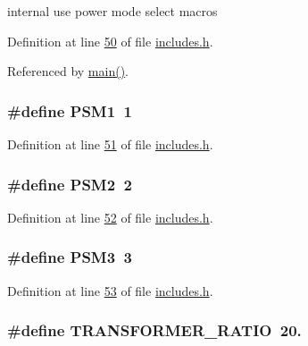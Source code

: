 internal use power mode select macros 



Definition at line \hyperlink{a00037_source_l00050}{50} of file \hyperlink{a00037_source}{includes.\-h}.



Referenced by \hyperlink{a00035_source_l00198}{main()}.

\hypertarget{a00037_aecb578b36faffafc55d7e5bfbe26df6a}{
\subsubsection[{P\-S\-M1}]{\setlength{\rightskip}{0pt plus 5cm}\#define P\-S\-M1~1}}\label{d1/dc6/a00037_aecb578b36faffafc55d7e5bfbe26df6a}


Definition at line \hyperlink{a00037_source_l00051}{51} of file \hyperlink{a00037_source}{includes.\-h}.

\hypertarget{a00037_a954ec88a13030fa5878310aa79f92b59}{
\subsubsection[{P\-S\-M2}]{\setlength{\rightskip}{0pt plus 5cm}\#define P\-S\-M2~2}}\label{d1/dc6/a00037_a954ec88a13030fa5878310aa79f92b59}


Definition at line \hyperlink{a00037_source_l00052}{52} of file \hyperlink{a00037_source}{includes.\-h}.

\hypertarget{a00037_aaaecd8504625316f84bd76accbcc42f0}{
\subsubsection[{P\-S\-M3}]{\setlength{\rightskip}{0pt plus 5cm}\#define P\-S\-M3~3}}\label{d1/dc6/a00037_aaaecd8504625316f84bd76accbcc42f0}


Definition at line \hyperlink{a00037_source_l00053}{53} of file \hyperlink{a00037_source}{includes.\-h}.

\hypertarget{a00037_abcedc82a86b3c2ac9850cb7c6f5e7a9b}{
\subsubsection[{T\-R\-A\-N\-S\-F\-O\-R\-M\-E\-R\-\_\-\-R\-A\-T\-I\-O}]{\setlength{\rightskip}{0pt plus 5cm}\#define T\-R\-A\-N\-S\-F\-O\-R\-M\-E\-R\-\_\-\-R\-A\-T\-I\-O~20.}}\label{d1/dc6/a00037_abcedc82a86b3c2ac9850cb7c6f5e7a9b}


